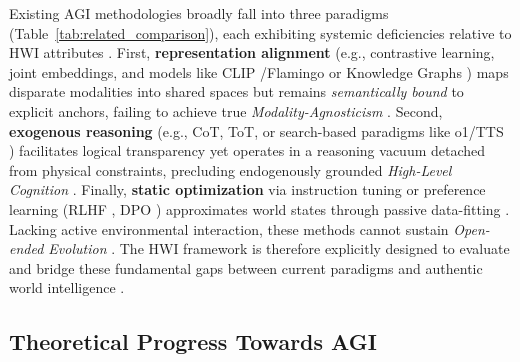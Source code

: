 Existing AGI methodologies broadly fall into three paradigms (Table~\ref{tab:related_comparison}), each exhibiting systemic deficiencies relative to HWI attributes \cite{marcus2020next}.
First, \textbf{representation alignment} (e.g., contrastive learning, joint embeddings, and models like CLIP \cite{radford2021learning}/Flamingo \cite{alayrac2022flamingo} or Knowledge Graphs \cite{ji2021survey}) maps disparate modalities into shared spaces but remains \emph{semantically bound} to explicit anchors, failing to achieve true \emph{Modality-Agnosticism} \cite{yuksekgonul2022and}.
Second, \textbf{exogenous reasoning} (e.g., CoT, ToT, or search-based paradigms like o1/TTS \cite{snell2024scaling}) facilitates logical transparency yet operates in a reasoning vacuum detached from physical constraints, precluding endogenously grounded \emph{High-Level Cognition} \cite{pearl2018theoretical}.
Finally, \textbf{static optimization} via instruction tuning or preference learning (RLHF \cite{ouyang2022training}, DPO \cite{rafailov2023direct}) approximates world states through passive data-fitting \cite{bender2020climbing}. Lacking active environmental interaction, these methods cannot sustain \emph{Open-ended Evolution} \cite{lehman2011abandoning}.
The HWI framework is therefore explicitly designed to evaluate and bridge these fundamental gaps between current paradigms and authentic world intelligence \cite{bisk2020experience}.

\vspace{-2mm}
\subsection{Theoretical Progress Towards AGI}

